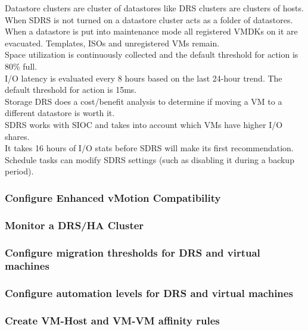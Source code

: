 Datastore clusters are cluster of datastores like DRS clusters are clusters
of hosts. When SDRS is not turned on a datastore cluster acts as a folder of
datastores.\\

When a datastore is put into maintenance mode all registered VMDKs on it are
evacuated. Templates, ISOs and unregistered VMs remain.\\

Space utilization is continuously collected and the default threshold for
action is 80\% full.\\

I/O latency is evaluated every 8 hours based on the last 24-hour trend. The
default threshold for action is 15ms.\\

Storage DRS does a cost/benefit analysis to determine if moving a VM to a
different datastore is worth it.\\

SDRS works with SIOC and takes into account which VMs have higher I/O shares.\\

It takes 16 hours of I/O stats before SDRS will make its first recommendation.\\

Schedule tasks can modify SDRS settings (such as disabling it during a backup
period).

\subsubsection{Configure Enhanced vMotion Compatibility}

\subsubsection{Monitor a DRS/HA Cluster}

\subsubsection{Configure migration thresholds for DRS and virtual machines}

\subsubsection{Configure automation levels for DRS and virtual machines}

\subsubsection{Create VM-Host and VM-VM affinity rules}


